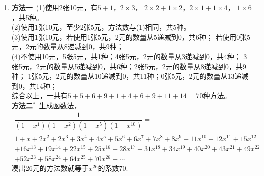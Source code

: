\begin{enumerate}[label={\textbf{\arabic*.}},leftmargin=
    \inteval{\myenumleftmargin}pt]
\item \textbf{方法一}\ 
(1)使用2张10元，有$ 5+1 $，$ 2\times 3 $，
$ 2\times 2+1\times 2 $，$ 2\times 1+1\times 4 $，
$ 1\times 6 $，共5种。\\
(2)使用1张10元，至少2张5元，方法数与(1)相同，共5种。\\
(3)使用1张10元，若使用1张5元，2元的数量从5递减到0，共6种；
若使用0张5元，2元的数量从8递减到0，共9种；\\
(4)不使用10元，5张5元，共1种；4张5元，2元的数量从3递减到0，共4种；
3张5元，2元的数量从5递减到0，共6种；2张5元，2元的数量从8递减到0，共9种；
1张5元，2元的数量从10递减到0，共11种；0张5元，2元的数量从13递减到0，共14种；\\
综合以上，一共有$ 5+5+6+9+1+4+6+9+11+14=70 $种方法。\\
\textbf{方法二}$ ^* $\ 生成函数法，
\begin{gather*}
    \dfrac{1}{(1-x^1)(1-x^2)(1-x^{5})(1-x^{10})}=\\
    1+x+2x^{2}+2x^{3}+3x^{4}+4x^{5}+5x^{6}+6x^{7}+7x^{8}+8x^{9}+11x^{10}+12x^{11}+15x^{12}\\ +16x^{13}+19x^{14}+22x^{15}+25x^{16}+28x^{17}+31x^{18}+34x^{19}+40x^{20}+43x^{21}+49x^{22}\\
    +52x^{23}+58x^{24}+64x^{25}+70x^{26}+\cdots
\end{gather*}
凑出26元的方法数就等于$ x^{26} $的系数70. 
 
\end{enumerate}
\myfootnote{\CopyrightStatementChap}
\cleardoublepage

